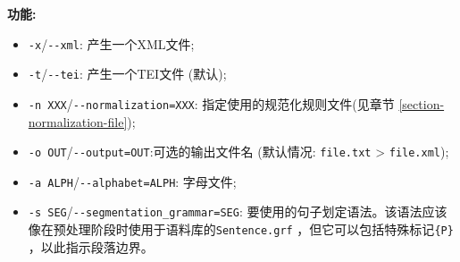 \bigskip
\noindent \textbf{功能:}
\begin{itemize}
\item \verb+-x+/\verb+--xml+: 产生一个XML文件;
  
  \item \verb+-t+/\verb+--tei+: 产生一个TEI文件 (默认);

  \item \verb+-n XXX+/\verb+--normalization=XXX+: 指定使用的规范化规则文件(见章节 \ref{section-normalization-file});

  \item \verb+-o OUT+/\verb+--output=OUT+:可选的输出文件名 (默认情况:
  \verb+file.txt+ > \verb+file.xml+);

  \item \verb+-a ALPH+/\verb+--alphabet=ALPH+: 字母文件;
  
  \item \verb+-s SEG+/\verb+--segmentation_grammar=SEG+: 要使用的句子划定语法。该语法应该像在预处理阶段时使用于语料库的\verb+Sentence.grf+ ，但它可以包括特殊标记\verb+{P}+ ，以此指示段落边界。
  
\end{itemize}

